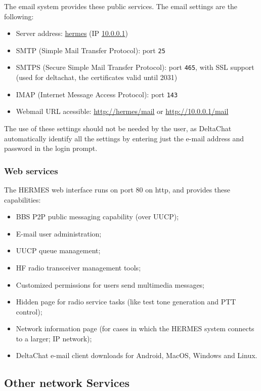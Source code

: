 \documentclass[11pt,a4paper]{article}
\begin{document}
The email system provides these public services. The email settings are the following:

\begin{itemize}
    \item Server address: \url{hermes} (IP \url{10.0.0.1})
    \item SMTP (Simple Mail Transfer Protocol): port \texttt{25}
    \item SMTPS (Secure Simple Mail Transfer Protocol): port \texttt{465}, with SSL support 
    (used for deltachat, the certificates valid until 2031)
    \item IMAP (Internet Message Access Protocol): port \texttt{143}
    \item Webmail URL acessible: \url{http://hermes/mail} or \url{http://10.0.0.1/mail}
\end{itemize}

The use of these settings should not be needed by the user, as DeltaChat automatically identify all the settings by entering just the e-mail address and password in the login prompt.

\subsubsection{Web services}
\label{apx_net_web}

The HERMES web interface runs on port 80 on http, and provides these capabilities:
\begin{itemize}
    \item BBS P2P public messaging capability (over UUCP);
    \item E-mail user administration;
    \item UUCP queue management;
    \item HF radio transceiver management tools;
    \item Customized permissions for users send multimedia messages;
    \item Hidden page for radio service tasks (like test tone generation and PTT control);
    \item Network information page (for cases in which the HERMES system connects to a larger; IP network);
    \item DeltaChat e-mail client downloads for Android, MacOS, Windows and Linux.
\end{itemize}

\subsection{Other network Services }
\label{apx_other_net}
\end{document}
